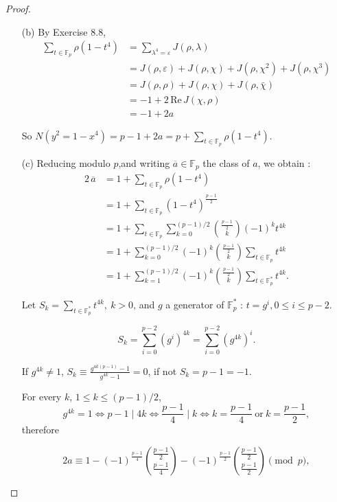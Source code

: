 \documentclass[11pt,a4paper]{article}
\newcommand{\F}{\mathbb{F}}
\newcommand{\re}{\,\mathrm{Re}\,}
\begin{document}
{\begin{proof}
\begin{enumerate}
Thus $N(y^2+x^4 = 1) = p + 2\re J(\chi,\rho) + J(\rho,\rho) = p-1+2a$

In conclusion, 
$$N(y^2+x^4 = 1) = p-1+2a,  \ \mathrm{where}\  J(\chi,\rho) = a+bi.$$

\item[(b)]  By Exercise 8.8, 
\begin{align*}
\sum\limits_{t \in \mathbb{F}_p} \rho(1-t^4) &= \sum\limits_{\lambda^4 = \varepsilon} J(\rho,\lambda)\\
&=J(\rho,\varepsilon) + J(\rho,\chi)+ J(\rho,\chi^2)+ J(\rho,\chi^3)\\
&=J(\rho,\rho)+ J(\rho,\chi)+J(\rho,\bar{\chi})\\
&=-1 + 2 \re J(\chi,\rho)\\
&=-1+2a
\end{align*}

So $N(y^2=1-x^4) = p-1+2a = p+\sum\limits_{t\in \mathbb{F}_p} \rho(1-t^4)$.


\item[(c)]  Reducing modulo $p$,and writing $\overline{a} \in \F_p$ the class of $a$, we obtain :
\begin{align*}
2\,\overline{a}  &= 1 + \sum\limits_{t\in \mathbb{F}_p} \rho(1-t^4)\\
&= 1 + \sum\limits_{t\in \mathbb{F}_p}(1-t^4)^{\frac{p-1}{2}}\\
&=1 + \sum\limits_{t\in \mathbb{F}_p} \sum\limits_{k=0}^{(p-1)/2} \binom{\frac{p-1}{2}}{k} (-1)^k t^{4k}\\
&= 1 + \sum\limits_{k=0}^{(p-1)/2}(-1)^k \binom{\frac{p-1}{2}}{k}\sum_{t\in \mathbb{F}_p}  t^{4k}\\
&= 1 + \sum\limits_{k=1}^{(p-1)/2}(-1)^k \binom{\frac{p-1}{2}}{k}\sum\limits_{t\in \mathbb{F}_p^*}   t^{4k}.
\end{align*}

Let $S_k = \sum\limits_{t\in \F_p^*}  t^{4k} ,\  k>0 $, and $g$ a generator of $\F_p^*$ : $t = g^i, 0 \leq i \leq p-2$.

$$S_k = \sum\limits_{i=0}^{p-2} (g^{i})^{4k}=\sum\limits_{i=0}^{p-2} (g^{4k})^i.$$

If $g^{4k} \ne 1$, $S_k \equiv \frac{g^{4k(p-1)}-1}{g^{4k}-1} = 0$, if not $S_k = p-1 = -1$.


For every $k$, $1\leq k \leq (p-1)/2$,
$$g^{4k} = 1\iff p-1 \mid 4k \iff \frac{p-1}{4} \mid k \iff k=\frac{p-1}{4} \ \mathrm{or}\  k=\frac{p-1}{2},$$ therefore

$$2a \equiv 1 - (-1)^{\frac{p-1}{4}}\binom{\frac{p-1}{2}}{\frac{p-1}{4}} - (-1)^{\frac{p-1}{2}}\binom{\frac{p-1}{2}}{\frac{p-1}{2}}\pmod p,$$


\end{enumerate}
\end{proof}}
\end{document}

